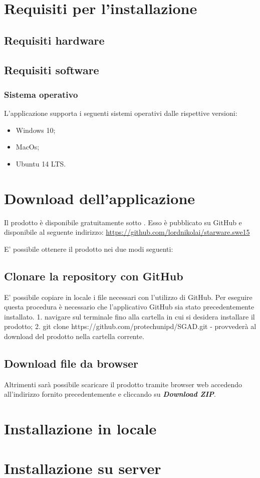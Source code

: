 \documentclass[12pt,a4paper]{article}
\begin{document}
	\newpage
	\section{Requisiti per l'installazione}\label{requisiti}
	\subsection{Requisiti hardware}\label{requisitiHW}
	\subsection{Requisiti software}\label{requisitiSW}
	\subsubsection{Sistema operativo}
	L'applicazione \prj{} supporta i seguenti sistemi operativi dalle rispettive versioni:
	\begin{itemize}
		\item Windows 10;
		\item MacOs;
		\item Ubuntu 14 LTS.
	\end{itemize}
	\section{Download dell'applicazione}\label{download}
	Il prodotto è disponibile gratuitamente sotto . Esso è pubblicato
	su GitHub e disponibile al seguente indirizzo: \url{https://github.com/lordnikolai/starware.swe15}
	
	E' possibile ottenere il prodotto nei due modi seguenti:
	\subsection{Clonare la repository con GitHub}
	E' possibile copiare in locale i file necessari con l'utilizzo di GitHub. 
	Per eseguire questa procedura è necessario che l'applicativo GitHub sia stato precedentemente installato.
	1. navigare sul terminale fino alla cartella in cui si desidera installare il prodotto;
	2. git clone https://github.com/protechunipd/SGAD.git - provvederà al download
	del prodotto nella cartella corrente.
	\subsection{Download file da browser}
	Altrimenti sarà possibile scaricare il prodotto tramite browser web accedendo
	all’indirizzo fornito precedentemente e cliccando su \textbf{\textit{Download ZIP}}.
	
	\section{Installazione in locale}\label{local_install}
	\section{Installazione su server}\label{server_install}


	
	
	
	


	
\end{document}
